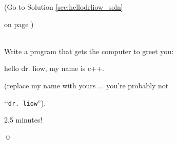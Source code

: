 \label{sec:hellodrliow}

(Go to Solution \ref{sec:hellodrliow_soln} 

on page \pageref{sec:hellodrliow_soln}) 

\\

Write a program that gets the computer to greet you:

\begin{console}

hello dr. liow, my name is c++.

\end{console}

(replace my name with yours ...  you're probably not 

\lq\lq\verb!dr. liow!'').

2.5 minutes!

\qed


